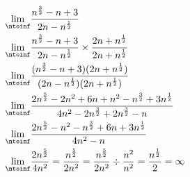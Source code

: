 
\begin{align}
    \lim_{\ntoinf}& \frac{n^{\frac{3}{2}} - n + 3}{2n - n^{\frac{1}{2}}} \\
    \lim_{\ntoinf}& \frac{n^{\frac{3}{2}} - n + 3}{2n - n^{\frac{1}{2}}} 
    \times \frac{2n + n^{\frac{1}{2}}}{2n + n^{\frac{1}{2}}}  \\
    \lim_{\ntoinf}& \frac{(n^{\frac{3}{2}} - n + 3)(2n + n^{\frac{1}{2}})}{(2n - n^{\frac{1}{2}})(2n + n^{\frac{1}{2}})} \\
    \lim_{\ntoinf}& 
    \frac{ 2n^{\frac{5}{2}} - 2n^2 + 6n + n^2 - n^{\frac{3}{2}} + 3n^{\frac{1}{2}} }
    { 4n^2 - 2n^{\frac{3}{2}} + 2n^{\frac{3}{2}} - n } \\
    \lim_{\ntoinf}&
    \frac{ 2n^{\frac{5}{2}} - n^2 - n^{\frac{3}{2}} + 6n + 3n^{\frac{1}{2}} }
    { 4n^2 - n } \\
    \lim_{\ntoinf}&\frac{ 2n^{\frac{5}{2}} }{ 4n^2 } 
    = \frac{ n^{\frac{5}{2}} }{ 2n^2 } 
    = \frac{ n^{\frac{5}{2}} }{ 2n^2 } \div \frac{n^2}{n^2} 
    = \frac{n^{\frac{1}{2}}}{2} = \infty \\
\end{align}

\pagebreak
